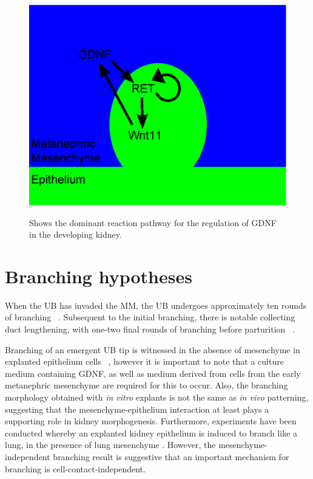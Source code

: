 \documentclass[pdftex,10pt,a4paper,twocolumn]{article}
\begin{document}
\begin{figure}[t] 
\centering
\scalebox{0.35} 
{\includegraphics{pathways.eps}}
\caption{Shows the dominant reaction pathway for the regulation of GDNF in the developing kidney.}\label{fig:pathways}
\end{figure} 

\section{Branching hypotheses}\label{sec:branchinghyp}
When the UB has invaded the MM, the UB undergoes approximately ten rounds of branching ~\cite{srinivas1999expression}. Subsequent to the initial branching, there is notable collecting duct lengthening, with one-two final rounds of branching before parturition ~\cite{cebrian2004morphometric}.

Branching of an emergent UB tip is witnessed in the absence of mesenchyme in explanted epithelium cells ~\cite{qiao1999branching}, however it is important to note that a culture medium containing GDNF, as well as medium derived from cells from the early metanephric mesenchyme are required for this to occur. Also, the branching morphology obtained with \textit{in vitro} explants is not the same as \textit{in vivo} patterning, suggesting that the mesenchyme-epithelium interaction at least plays a supporting role in kidney morphogenesis. Furthermore, experiments have been conducted whereby an explanted kidney epithelium is induced to branch like a lung, in the presence of lung mesenchyme \cite{lin2001induced}. However, the mesenchyme-independent branching result is suggestive that an important mechanism for branching is cell-contact-independent.
\end{document}
